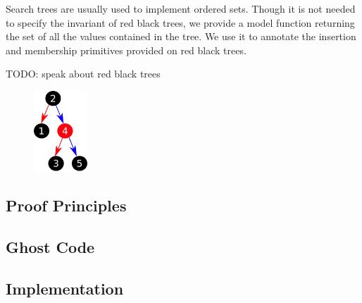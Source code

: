 \documentclass[11pt,a4paper]{article}
\begin{document}
Search trees are usually used to implement ordered sets. Though it is not needed to
specify the invariant of red black trees, we provide a model function returning the
set of all the values contained in the tree. We use it to annotate the insertion and
membership primitives provided on red black trees.

{\color{red} TODO: speak about red black trees}

\begin{figure}[ht]
\begin{center}
\includegraphics[width=2cm]{red_black.pdf}
\end{center}
\end{figure}

\subsection{Proof Principles}

\subsection{Ghost Code}

\subsection{Implementation}
\end{document}
